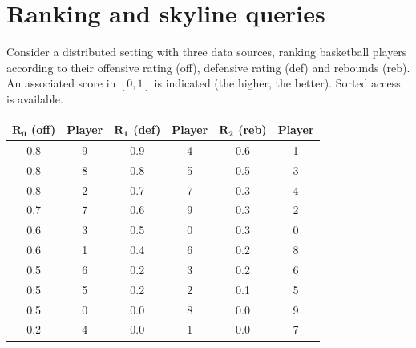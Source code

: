 \section{Ranking and skyline queries}

Consider a distributed setting with three data sources, ranking basketball players according to their offensive rating (off), defensive rating (def) and rebounds (reb).
An associated score in $[0,1]$ is indicated (the higher, the better). Sorted access is available.
\begin{table}[H]
    \centering
    \begin{tabular}{|cc|cc|cc|}
    \hline
    $\boldsymbol{R_0}$ \textbf{(off)} & \textbf{Player} & $\boldsymbol{R_1}$ \textbf{(def)} & \textbf{Player} & $\boldsymbol{R_2}$ \textbf{(reb)} & \textbf{Player} \\ \hline
    0.8         & 9      & 0.9         & 4      & 0.6         & 1      \\
    0.8         & 8      & 0.8         & 5      & 0.5         & 3      \\
    0.8         & 2      & 0.7         & 7      & 0.3         & 4      \\
    0.7         & 7      & 0.6         & 9      & 0.3         & 2      \\
    0.6         & 3      & 0.5         & 0      & 0.3         & 0      \\
    0.6         & 1      & 0.4         & 6      & 0.2         & 8      \\
    0.5         & 6      & 0.2         & 3      & 0.2         & 6      \\
    0.5         & 5      & 0.2         & 2      & 0.1         & 5      \\
    0.5         & 0      & 0.0         & 8      & 0.0         & 9      \\
    0.2         & 4      & 0.0         & 1      & 0.0         & 7      \\ \hline
    \end{tabular}
\end{table}
